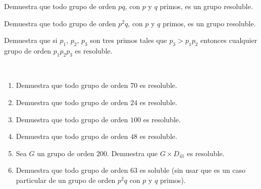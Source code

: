 \begin{ejercicio}
    Demuestra que todo grupo de orden $pq$, con $p$ y $q$ primos, es un grupo resoluble.

\end{ejercicio}

\begin{ejercicio}
    Demuestra que todo grupo de orden $p^2q$, con $p$ y $q$ primos, es un grupo resoluble.


\end{ejercicio}

\begin{ejercicio}
    Demuestra que si $p_1$, $p_2$, $p_3$ son tres primos tales que $p_3 > p_1 p_2$ entonces cualquier grupo de orden $p_1 p_2 p_3$ es resoluble.


\end{ejercicio}

\begin{ejercicio}~
    \begin{enumerate}
        \item Demuestra que todo grupo de orden $70$ es resoluble.
        \item Demuestra que todo grupo de orden $24$ es resoluble.
        \item Demuestra que todo grupo de orden $100$ es resoluble.
        \item Demuestra que todo grupo de orden $48$ es resoluble.
        \item Sea $G$ un grupo de orden $200$. Demuestra que $G \times D_{41}$ es resoluble.
        \item Demuestra que todo grupo de orden $63$ es soluble (sin usar que es un caso particular de un grupo de orden $p^2q$ con $p$ y $q$ primos).
    \end{enumerate}

\end{ejercicio}